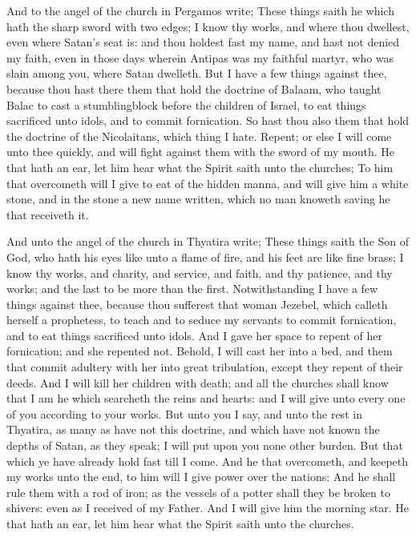  And to the angel of the church in Pergamos write; These
things saith he which hath the sharp sword with two edges;
 I know thy works, and where thou dwellest, even where
Satan's seat is: and thou holdest fast my name, and hast not denied my
faith, even in those days wherein Antipas was my faithful martyr, who
was slain among you, where Satan dwelleth.  But I have a
few things against thee, because thou hast there them that hold the
doctrine of Balaam, who taught Balac to cast a stumblingblock before the
children of Israel, to eat things sacrificed unto idols, and to commit
fornication.  So hast thou also them that hold the
doctrine of the Nicolaitans, which thing I hate.  Repent;
or else I will come unto thee quickly, and will fight against them with
the sword of my mouth.  He that hath an ear, let him hear
what the Spirit saith unto the churches; To him that overcometh will I
give to eat of the hidden manna, and will give him a white stone, and in
the stone a new name written, which no man knoweth saving he that
receiveth it.

 And unto the angel of the church in Thyatira write;
These things saith the Son of God, who hath his eyes like unto a flame
of fire, and his feet are like fine brass;  I know thy
works, and charity, and service, and faith, and thy patience, and thy
works; and the last to be more than the first. 
Notwithstanding I have a few things against thee, because thou sufferest
that woman Jezebel, which calleth herself a prophetess, to teach and to
seduce my servants to commit fornication, and to eat things sacrificed
unto idols.  And I gave her space to repent of her
fornication; and she repented not.  Behold, I will cast
her into a bed, and them that commit adultery with her into great
tribulation, except they repent of their deeds.  And I
will kill her children with death; and all the churches shall know that
I am he which searcheth the reins and hearts: and I will give unto every
one of you according to your works.  But unto you I say,
and unto the rest in Thyatira, as many as have not this doctrine, and
which have not known the depths of Satan, as they speak; I will put upon
you none other burden.  But that which ye have already
hold fast till I come.  And he that overcometh, and
keepeth my works unto the end, to him will I give power over the
nations:  And he shall rule them with a rod of iron; as
the vessels of a potter shall they be broken to shivers: even as I
received of my Father.  And I will give him the morning
star.  He that hath an ear, let him hear what the Spirit
saith unto the churches.

